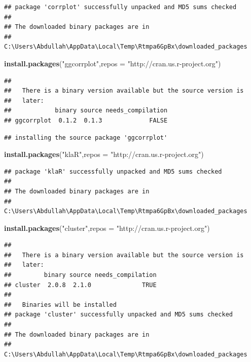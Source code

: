 \documentclass[]{article}
\newenvironment{Shaded}{\begin{snugshade}}{\end{snugshade}}
\newcommand{\KeywordTok}[1]{\textcolor[rgb]{0.13,0.29,0.53}{\textbf{#1}}}
\newcommand{\DataTypeTok}[1]{\textcolor[rgb]{0.13,0.29,0.53}{#1}}
\newcommand{\StringTok}[1]{\textcolor[rgb]{0.31,0.60,0.02}{#1}}
\newcommand{\NormalTok}[1]{#1}
\begin{document}
\begin{verbatim}
## package 'corrplot' successfully unpacked and MD5 sums checked
## 
## The downloaded binary packages are in
##  C:\Users\Abdullah\AppData\Local\Temp\Rtmpa6GpBx\downloaded_packages
\end{verbatim}

\begin{Shaded}
\begin{Highlighting}[]
\KeywordTok{install.packages}\NormalTok{(}\StringTok{"ggcorrplot"}\NormalTok{,}\DataTypeTok{repos =} \StringTok{"http://cran.us.r-project.org"}\NormalTok{)}
\end{Highlighting}
\end{Shaded}

\begin{verbatim}
## 
##   There is a binary version available but the source version is
##   later:
##            binary source needs_compilation
## ggcorrplot  0.1.2  0.1.3             FALSE
\end{verbatim}

\begin{verbatim}
## installing the source package 'ggcorrplot'
\end{verbatim}

\begin{Shaded}
\begin{Highlighting}[]
\KeywordTok{install.packages}\NormalTok{(}\StringTok{"klaR"}\NormalTok{,}\DataTypeTok{repos =} \StringTok{"http://cran.us.r-project.org"}\NormalTok{)}
\end{Highlighting}
\end{Shaded}

\begin{verbatim}
## package 'klaR' successfully unpacked and MD5 sums checked
## 
## The downloaded binary packages are in
##  C:\Users\Abdullah\AppData\Local\Temp\Rtmpa6GpBx\downloaded_packages
\end{verbatim}

\begin{Shaded}
\begin{Highlighting}[]
\KeywordTok{install.packages}\NormalTok{(}\StringTok{"cluster"}\NormalTok{,}\DataTypeTok{repos =} \StringTok{"http://cran.us.r-project.org"}\NormalTok{)}
\end{Highlighting}
\end{Shaded}

\begin{verbatim}
## 
##   There is a binary version available but the source version is
##   later:
##         binary source needs_compilation
## cluster  2.0.8  2.1.0              TRUE
## 
##   Binaries will be installed
## package 'cluster' successfully unpacked and MD5 sums checked
## 
## The downloaded binary packages are in
##  C:\Users\Abdullah\AppData\Local\Temp\Rtmpa6GpBx\downloaded_packages
\end{verbatim}
\end{document}
